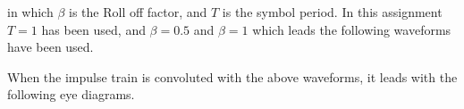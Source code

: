 \documentclass{article}
\begin{document}
        in which \(\beta\) is the Roll off factor, and \(T\) is the symbol period. In this assignment \(T=1\) has been used, and \(\beta = 0.5\) and \(\beta = 1\) which leads the following waveforms have been used.

        \begin{figure}[!htb]
                \centering
        \end{figure}

        \begin{figure}[!htb]
                \centering
        \end{figure}

        \newpage
        When the impulse train is convoluted with the above waveforms, it leads with the following eye diagrams.

        \begin{figure}[!htb]
                \centering
        \end{figure}
\end{document}
